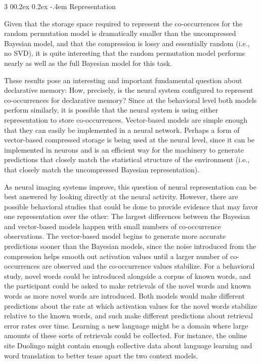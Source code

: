 \documentclass[man,floatsintext,donotrepeattitle]{apa6}
\makeatletter
\renewcommand{\subsubsection}{%
  \@startsection
  {subsubsection}%
  {3}%
  {\parindent}%
  {0\baselineskip \@plus 0.2ex \@minus 0.2ex}%
  {-.4em}%
  {\normalfont\normalsize\bfseries\addperi}}
\makeatother
\begin{document}
\subsubsection{Representation}

Given that the storage space required to represent the co-occurrences for the random permutation model is dramatically smaller than the uncompressed Bayesian model,
and that the compression is lossy and essentially random (i.e., no SVD),
it is quite interesting that the random permutation model performs nearly as well as the full Bayesian model for this task.

These results pose an interesting and important fundamental question about declarative memory:
How, precisely, is the neural system configured to represent co-occurrences for declarative memory?
Since at the behavioral level both models perform similarly, it is possible that the neural system is using either representation to store co-occurrences.
Vector-based models are simple enough that they can easily be implemented in a neural network.
Perhaps a form of vector-based compressed storage is being used at the neural level,
since it can be implemented in neurons and is an efficient way for the machinery to generate predictions that closely match the statistical structure of the environment
(i.e., that closely match the uncompressed Bayesian representation).

As neural imaging systems improve, this question of neural representation can be best answered by looking directly at the neural activity.
However, there are possible behavioral studies that could be done to provide evidence that may favor one representation over the other:
The largest differences between the Bayesian and vector-based models happen with small numbers of co-occurrence observations.
The vector-based model begins to generate more accurate predictions sooner than the Bayesian models,
since the noise introduced from the compression helps smooth out activation values until a larger number of co-occurrences are observed and the co-occurrence values stabilize.
For a behavioral study, novel words could be introduced alongside a corpus of known words, and the participant could be asked to make retrievals of the novel words and known words as more novel words are introduced.
Both models would make different predictions about the rate at which activation values for the novel words stabilize relative to the known words, and such make different predictions about retrieval error rates over time.
Learning a new language might be a domain where large amounts of these sorts of retrievals could be collected.
For instance, the online site Duolingo might contain enough collective data about language learning and word translation to better tease apart the two context models.
\end{document}
